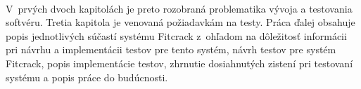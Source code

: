  \\
V~prvých dvoch kapitolách je preto rozobraná problematika vývoja a testovania softvéru.
Tretia kapitola je venovaná požiadavkám na testy.
Práca ďalej obsahuje popis jednotlivých súčastí systému Fitcrack z~ohľadom na dôležitosť informácii pri návrhu a implementácii testov pre tento systém, návrh testov pre systém Fitcrack, popis implementácie testov, zhrnutie dosiahnutých zistení pri testovaní systému a popis práce do budúcnosti.

